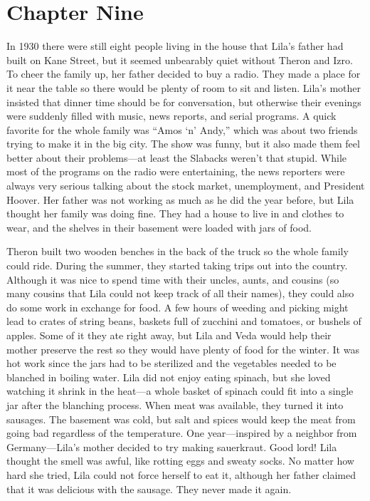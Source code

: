 \documentclass[
  letterpaper,
]{book}
\begin{document}

\chapter{Chapter Nine}\label{chapter-nine}

In 1930 there were still eight people living in the house that Lila's
father had built on Kane Street, but it seemed unbearably quiet without
Theron and Izro. To cheer the family up, her father decided to buy a
radio. They made a place for it near the table so there would be plenty
of room to sit and listen. Lila's mother insisted that dinner time
should be for conversation, but otherwise their evenings were suddenly
filled with music, news reports, and serial programs. A quick favorite
for the whole family was ``Amos `n' Andy,'' which was about two friends
trying to make it in the big city. The show was funny, but it also made
them feel better about their problems---at least the Slabacks weren't
that stupid. While most of the programs on the radio were entertaining,
the news reporters were always very serious talking about the stock
market, unemployment, and President Hoover. Her father was not working
as much as he did the year before, but Lila thought her family was doing
fine. They had a house to live in and clothes to wear, and the shelves
in their basement were loaded with jars of food.

Theron built two wooden benches in the back of the truck so the whole
family could ride. During the summer, they started taking trips out into
the country. Although it was nice to spend time with their uncles,
aunts, and cousins (so many cousins that Lila could not keep track of
all their names), they could also do some work in exchange for food. A
few hours of weeding and picking might lead to crates of string beans,
baskets full of zucchini and tomatoes, or bushels of apples. Some of it
they ate right away, but Lila and Veda would help their mother preserve
the rest so they would have plenty of food for the winter. It was hot
work since the jars had to be sterilized and the vegetables needed to be
blanched in boiling water. Lila did not enjoy eating spinach, but she
loved watching it shrink in the heat---a whole basket of spinach could
fit into a single jar after the blanching process. When meat was
available, they turned it into sausages. The basement was cold, but salt
and spices would keep the meat from going bad regardless of the
temperature. One year---inspired by a neighbor from Germany---Lila's
mother decided to try making sauerkraut. Good lord! Lila thought the
smell was awful, like rotting eggs and sweaty socks. No matter how hard
she tried, Lila could not force herself to eat it, although her father
claimed that it was delicious with the sausage. They never made it
again.
\end{document}
